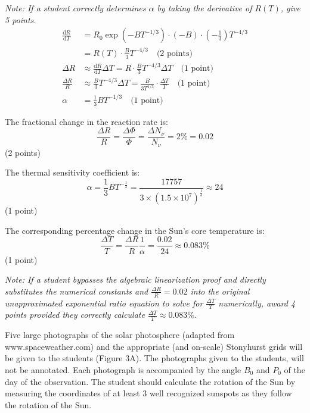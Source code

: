 \begin{description}
  \textit{Note: If a student correctly determines $\alpha$ by taking the
  derivative of $R(T)$, give 5 points.}
  \begin{align*}
    \frac{\mathrm{d}R}{\mathrm{d}T}
      &= R_0 \exp\left(-BT^{-1/3}\right) \cdot (-B) \cdot
         \left(-\frac{1}{3}\right) T^{-4/3} \\
      &= R(T) \cdot \frac{B}{3} T^{-4/3} \quad \text{(2 points)} \\
    \Delta R &\approx \frac{\mathrm{d}R}{\mathrm{d}T}\Delta T
      = R \cdot \frac{B}{3} T^{-4/3}\Delta T \quad \text{(1 point)} \\
    \frac{\Delta R}{R} &\approx \frac{B}{3} T^{-4/3}\Delta T
      = \frac{B}{3T^{1/3}} \cdot \frac{\Delta T}{T} \quad \text{(1 point)} \\
    \alpha &= \frac{1}{3}BT^{-1/3} \quad \text{(1 point)}
  \end{align*}

  The fractional change in the reaction rate is:
  \[ \frac{\Delta R}{R} = \frac{\Delta\Phi}{\Phi} = \frac{\Delta N_\nu}{N_\nu}
     = 2\% = 0.02 \]
  \hfill(2 points)

  The thermal sensitivity coefficient is:
  \[ \alpha = \frac{1}{3}BT^{-\frac{1}{3}}
     = \frac{17757}{3 \times (1.5 \times 10^7)^{\frac{1}{3}}} \approx 24 \]
  \hfill(1 point)

  The corresponding percentage change in the Sun's core temperature is:
  \[ \frac{\Delta T}{T} = \frac{\Delta R}{R}\frac{1}{\alpha}
     = \frac{0.02}{24} \approx 0.083\% \]
  \hfill(1 point)

  \textit{Note: If a student bypasses the algebraic linearization proof and
  directly substitutes the numerical constants and
  $\frac{\Delta R}{R} = 0.02$ into the original unapproximated exponential
  ratio equation to solve for $\frac{\Delta T}{T}$ numerically, award 4
  points provided they correctly calculate
  $\frac{\Delta T}{T} \approx 0.083\%$.}
\end{description}

Five large photographs of the solar photosphere (adapted from
www.spaceweather.com) and the appropriate (and on-scale) Stonyhurst grids will
be given to the students (Figure 3A). The photographs given to the students,
will not be annotated. Each photograph is accompanied by the angle $B_0$ and
$P_0$ of the day of the observation. The student should calculate the rotation
of the Sun by measuring the coordinates of at least 3 well recognized sunspots
as they follow the rotation of the Sun.


